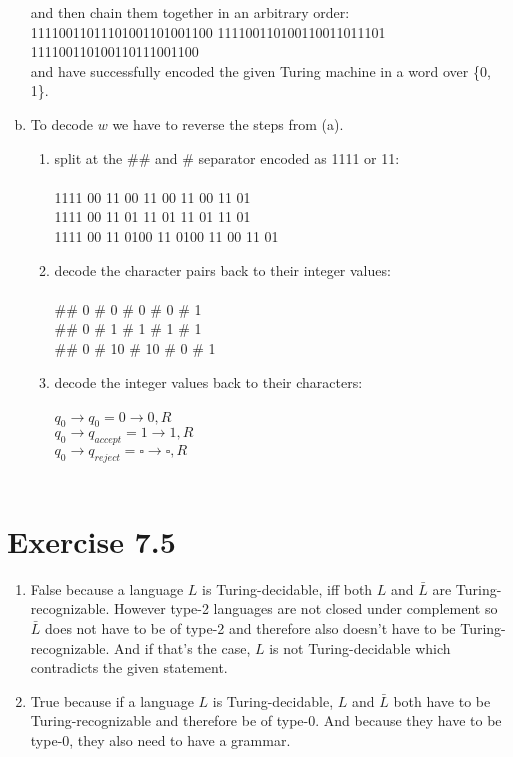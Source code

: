 \documentclass{article} %
\newcommand{\homeworkNumber}{7}
\begin{document}
\begin{enumerate}[(a)]
and then chain them together in an arbitrary order:\\
11110011011101001101001100 111100110100110011011101 111100110100110111001100\\
and have successfully encoded the given Turing machine in a word over \{0, 1\}.

\clearpage

\item
To decode $w$ we have to reverse the steps from (a).

\begin{enumerate}[1.]
\item split at the $\#\#$ and $\#$ separator encoded as 1111 or 11:\\\\
1111 00 11 00 11 00 11 00 11 01 \\
1111 00 11 01 11 01 11 01 11 01 \\
1111 00 11 0100 11 0100 11 00 11 01 \\

\item decode the character pairs back to their integer values:\\\\
\#\# 0 \# 0 \# 0 \# 0 \# 1 \\
\#\# 0 \# 1 \# 1 \# 1 \# 1 \\
\#\# 0 \# 10 \# 10 \# 0 \# 1 \\

\item decode the integer values back to their characters:\\\\
$q_0 \to q_0 = 0 \to 0, R$\\
$q_0 \to q_{accept} = 1 \to 1, R$\\
$q_0 \to q_{reject} = \square \to \square, R$\\\\


\end{enumerate}
\end{enumerate}

\section*{Exercise \homeworkNumber.5}
\begin{enumerate}
\item False because a language $L$ is Turing-decidable, iff both $L$ and $\bar{L}$ are Turing-recognizable. However type-2 languages are not closed under complement so $\bar{L}$ does not have to be of type-2 and therefore also doesn't have to be Turing-recognizable. And if that's the case, $L$ is not Turing-decidable which contradicts the given statement.

\item True because if a language $L$ is Turing-decidable, $L$ and $\bar{L}$ both have to be Turing-recognizable and therefore be of type-0. And because they have to be type-0, they also need to have a grammar.
\end{enumerate}
\end{document}
